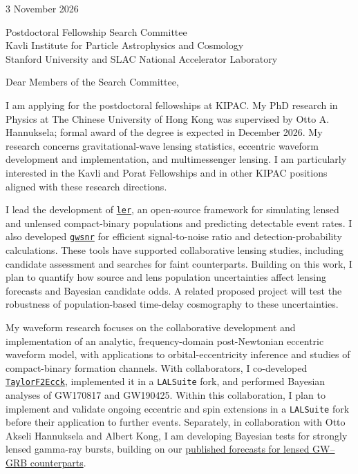 \documentclass[11pt]{article}
\begin{document}

3 November 2026

Postdoctoral Fellowship Search Committee\\
Kavli Institute for Particle Astrophysics and Cosmology\\
Stanford University and SLAC National Accelerator Laboratory

Dear Members of the Search Committee,

I am applying for the postdoctoral fellowships at KIPAC. My PhD research in Physics at The Chinese University of Hong Kong was supervised by Otto A. Hannuksela; formal award of the degree is expected in December 2026. My research concerns gravitational-wave lensing statistics, eccentric waveform development and implementation, and multimessenger lensing. I am particularly interested in the Kavli and Porat Fellowships and in other KIPAC positions aligned with these research directions.

I lead the development of \href{https://ler.hemantaph.com/}{\texttt{ler}}, an open-source framework for simulating lensed and unlensed compact-binary populations and predicting detectable event rates. I also developed \href{https://gwsnr.hemantaph.com/}{\texttt{gwsnr}} for efficient signal-to-noise ratio and detection-probability calculations. These tools have supported collaborative lensing studies, including candidate assessment and searches for faint counterparts. Building on this work, I plan to quantify how source and lens population uncertainties affect lensing forecasts and Bayesian candidate odds. A related proposed project will test the robustness of population-based time-delay cosmography to these uncertainties.

My waveform research focuses on the collaborative development and implementation of an analytic, frequency-domain post-Newtonian eccentric waveform model, with applications to orbital-eccentricity inference and studies of compact-binary formation channels. With collaborators, I co-developed \href{https://arxiv.org/abs/2508.12697}{\texttt{TaylorF2Ecck}}, implemented it in a \texttt{LALSuite} fork, and performed Bayesian analyses of GW170817 and GW190425. Within this collaboration, I plan to implement and validate ongoing eccentric and spin extensions in a \texttt{LALSuite} fork before their application to further events. Separately, in collaboration with Otto Akseli Hannuksela and Albert Kong, I am developing Bayesian tests for strongly lensed gamma-ray bursts, building on our \href{https://arxiv.org/abs/2502.02536}{published forecasts for lensed GW--GRB counterparts}.
\end{document}
